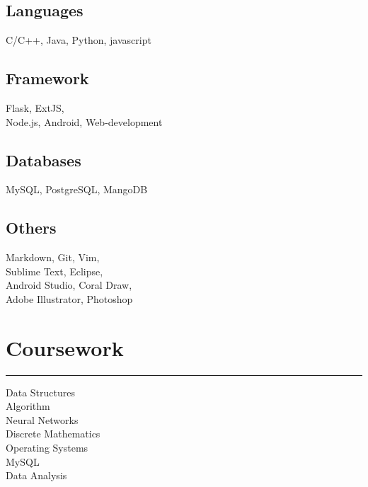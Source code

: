 \documentclass[]{sahana}
\begin{document}
\begin{minipage}[t]{0.33\textwidth}
\subsection{Languages}
C/C++, Java, Python, javascript
\vspace{6pt}
\subsection{Framework}
Flask, ExtJS, \\Node.js, Android,
Web-development
\vspace{6pt}
\subsection{Databases}
MySQL, PostgreSQL, MangoDB
\vspace{6pt}
\subsection{Others}
Markdown, Git, Vim, \\Sublime Text, Eclipse,\\
Android Studio, Coral Draw,\\
Adobe Illustrator, Photoshop
\sectionsep
\section{Coursework}
\noindent\rule{5cm}{0.4pt}

Data Structures\\
Algorithm\\
Neural Networks\\
Discrete Mathematics\\
Operating Systems\\
MySQL\\
Data Analysis
\sectionsep

%
%

\end{minipage} 
\hfill
\end{document}
